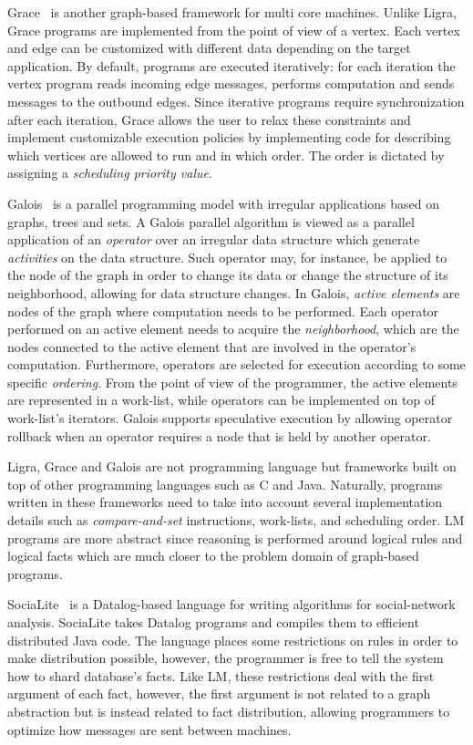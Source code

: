 Grace~\cite{wang:asynchronous} is another graph-based framework for multi core
machines. Unlike Ligra, Grace programs are implemented from the point of view of
a vertex. Each vertex and edge can be customized with different data depending
on the target application. By default, programs are executed iteratively: for
each iteration the vertex program reads incoming edge messages, performs
computation and sends messages to the outbound edges. Since iterative programs
require synchronization after each iteration, Grace allows the user to relax
these constraints and implement customizable execution policies by implementing
code for describing which vertices are allowed to run and in which order. The
order is dictated by assigning a \emph{scheduling priority value}.

Galois~\cite{Pingali:2011:TPA:1993316.1993501} is a parallel programming model
with irregular applications based on graphs, trees and sets. A Galois parallel
algorithm is viewed as a parallel application of an \emph{operator} over an
irregular data structure which generate \emph{activities} on the data structure.
Such operator may, for instance, be applied to the node of the graph in order to
change its data or change the structure of its neighborhood, allowing for data
structure changes. In Galois, \emph{active elements} are nodes of the graph
where computation needs to be performed. Each operator performed on an active
element needs to acquire the \emph{neighborhood}, which are the nodes connected
to the active element that are involved in the operator's computation.
Furthermore, operators are selected for execution according to some specific
\emph{ordering}. From the point of view of the programmer, the active elements
are represented in a work-list, while operators can be implemented on top of
work-list's iterators. Galois supports speculative execution by allowing
operator rollback when an operator requires a node that is held by another
operator.

Ligra, Grace and Galois are not programming language but frameworks built on top
of other programming languages such as C and Java. Naturally, programs written
in these frameworks need to take into account several implementation details
such as \emph{compare-and-set} instructions, work-lists, and scheduling order.
LM programs are more abstract since reasoning is performed around logical rules
and logical facts which are much closer to the problem domain of graph-based
programs.

SociaLite~\cite{Seo:2013:DSD:2556549.2556572} is a Datalog-based language for
writing algorithms for social-network analysis. SociaLite takes Datalog programs
and compiles them to efficient distributed Java code. The language places some
restrictions on rules in order to make distribution possible, however, the
programmer is free to tell the system how to shard database's facts. Like LM,
these restrictions deal with the first argument of each fact, however, the first
argument is not related to a graph abstraction but is instead related to fact
distribution, allowing programmers to optimize how messages are sent between
machines.


